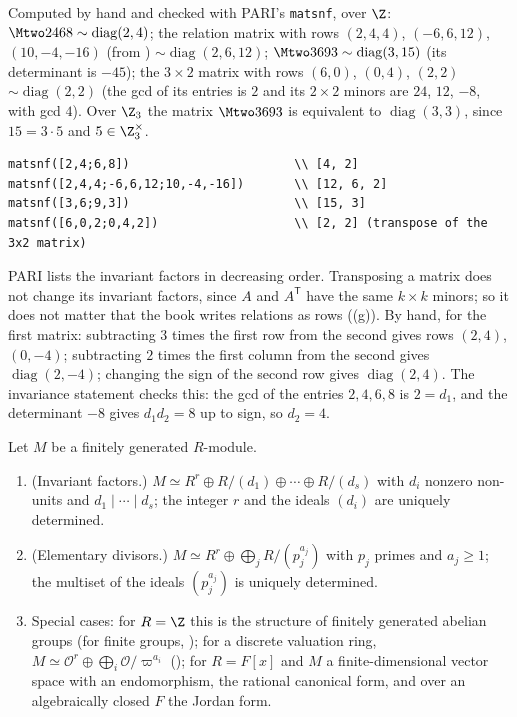 \begin{example}\label{ex:modules:smith}
Computed by hand and checked with PARI's \texttt{matsnf}, over $\Z$:
$\Mtwo2468\sim\operatorname{diag}(2,4)$; the relation matrix with rows $(2,4,4)$, $(-6,6,12)$, $(10,-4,-16)$ (from \cite[Section 12.1]{DummitFoote})
$\sim\operatorname{diag}(2,6,12)$; $\Mtwo3693\sim\operatorname{diag}(3,15)$ (its determinant is $-45$); the $3\times2$ matrix with rows $(6,0)$, $(0,4)$, $(2,2)$
$\sim\operatorname{diag}(2,2)$ (the gcd of its entries is $2$ and its $2\times2$ minors are $24$, $12$, $-8$, with gcd $4$). Over $\Z_3$ the matrix
$\Mtwo3693$ is equivalent to $\operatorname{diag}(3,3)$, since $15=3\cdot5$ and $5\in\Z_3^\times$.
\begin{lstlisting}[language=GP]
matsnf([2,4;6,8])                       \\ [4, 2]
matsnf([2,4,4;-6,6,12;10,-4,-16])       \\ [12, 6, 2]
matsnf([3,6;9,3])                       \\ [15, 3]
matsnf([6,0,2;0,4,2])                   \\ [2, 2] (transpose of the 3x2 matrix)
\end{lstlisting}
PARI lists the invariant factors in decreasing order. Transposing a matrix does not change its invariant factors, since $A$ and $A^{\mathsf T}$
have the same $k\times k$ minors; so it does not matter that the book writes relations as rows ((g)).
By hand, for the first matrix: subtracting $3$ times the first row from the second gives rows $(2,4)$, $(0,-4)$; subtracting $2$ times the first
column from the second gives $\operatorname{diag}(2,-4)$; changing the sign of the second row gives $\operatorname{diag}(2,4)$. The invariance statement
checks this: the gcd of the entries $2,4,6,8$ is $2=d_1$, and the determinant $-8$ gives $d_1d_2=8$ up to sign, so $d_2=4$.
\end{example}

\begin{theorem}\label{thm:modules:structure-pid}
Let $M$ be a finitely generated $R$-module.
\begin{enumerate}[label=(\roman*)]
\item (Invariant factors.) $M\simeq R^r\oplus R/(d_1)\oplus\cdots\oplus R/(d_s)$ with $d_i$ nonzero non-units and $d_1\mid\cdots\mid d_s$; the integer $r$ and the
ideals $(d_i)$ are uniquely determined.
\item (Elementary divisors.) $M\simeq R^r\oplus\bigoplus_jR/(p_j^{a_j})$ with $p_j$ primes and $a_j\ge1$; the multiset of the ideals $(p_j^{a_j})$ is
uniquely determined.
\item Special cases: for $R=\Z$ this is the structure of finitely generated abelian groups (for finite groups, );
for a discrete valuation ring, $M\simeq\mathcal O^r\oplus\bigoplus_i\mathcal O/\varpi^{a_i}$ (); for $R=F[x]$ and $M$ a
finite-dimensional vector space with an endomorphism, the rational canonical form, and over an algebraically closed $F$
the Jordan form.
\end{enumerate}
\end{theorem}

